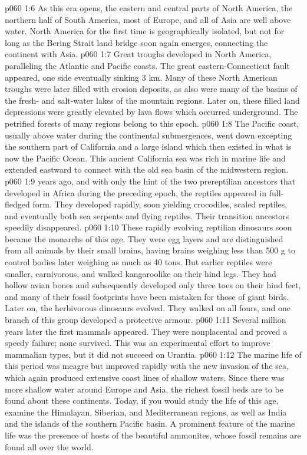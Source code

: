 \vs p060 1:6 As this era opens, the eastern and central parts of North America, the northern half of South America, most of Europe, and all of Asia are well above water. North America for the first time is geographically isolated, but not for long as the Bering Strait land bridge soon again emerges, connecting the continent with Asia.
\vs p060 1:7 Great troughs developed in North America, paralleling the Atlantic and Pacific coasts. The great eastern\hyp{}Connecticut fault appeared, one side eventually sinking 3 km. Many of these North American troughs were later filled with erosion deposits, as also were many of the basins of the fresh\hyp{} and salt\hyp{}water lakes of the mountain regions. Later on, these filled land depressions were greatly elevated by lava flows which occurred underground. The petrified forests of many regions belong to this epoch.
\vs p060 1:8 The Pacific coast, usually above water during the continental submergences, went down excepting the southern part of California and a large island which then existed in what is now the Pacific Ocean. This ancient California sea was rich in marine life and extended eastward to connect with the old sea basin of the midwestern region.
\vs p060 1:9 \pc {} years ago,  and with only the hint of the two prereptilian ancestors that developed in Africa during the preceding epoch, the reptiles appeared in full\hyp{}fledged form. They developed rapidly, soon yielding crocodiles, scaled reptiles, and eventually both sea serpents and flying reptiles. Their transition ancestors speedily disappeared.
\vs p060 1:10 These rapidly evolving reptilian dinosaurs soon became the monarchs of this age. They were egg layers and are distinguished from all animals by their small brains, having brains weighing less than 500 g to control bodies later weighing as much as 40 tons. But earlier reptiles were smaller, carnivorous, and walked kangaroolike on their hind legs. They had hollow avian bones and subsequently developed only three toes on their hind feet, and many of their fossil footprints have been mistaken for those of giant birds. Later on, the herbivorous dinosaurs evolved. They walked on all fours, and one branch of this group developed a protective armour.
\vs p060 1:11 Several million years later the first mammals appeared. They were nonplacental and proved a speedy failure; none survived. This was an experimental effort to improve mammalian types, but it did not succeed on Urantia.
\vs p060 1:12 The marine life of this period was meagre but improved rapidly with the new invasion of the sea, which again produced extensive coast lines of shallow waters. Since there was more shallow water around Europe and Asia, the richest fossil beds are to be found about these continents. Today, if you would study the life of this age, examine the Himalayan, Siberian, and Mediterranean regions, as well as India and the islands of the southern Pacific basin. A prominent feature of the marine life was the presence of hosts of the beautiful ammonites, whose fossil remains are found all over the world.
